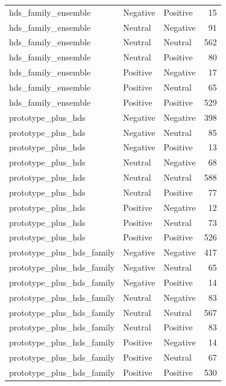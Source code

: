 \begin{tabular}{lllr}
hds\_family\_ensemble & Negative & Positive & 15 \\
hds\_family\_ensemble & Neutral & Negative & 91 \\
hds\_family\_ensemble & Neutral & Neutral & 562 \\
hds\_family\_ensemble & Neutral & Positive & 80 \\
hds\_family\_ensemble & Positive & Negative & 17 \\
hds\_family\_ensemble & Positive & Neutral & 65 \\
hds\_family\_ensemble & Positive & Positive & 529 \\
prototype\_plus\_hds & Negative & Negative & 398 \\
prototype\_plus\_hds & Negative & Neutral & 85 \\
prototype\_plus\_hds & Negative & Positive & 13 \\
prototype\_plus\_hds & Neutral & Negative & 68 \\
prototype\_plus\_hds & Neutral & Neutral & 588 \\
prototype\_plus\_hds & Neutral & Positive & 77 \\
prototype\_plus\_hds & Positive & Negative & 12 \\
prototype\_plus\_hds & Positive & Neutral & 73 \\
prototype\_plus\_hds & Positive & Positive & 526 \\
prototype\_plus\_hds\_family & Negative & Negative & 417 \\
prototype\_plus\_hds\_family & Negative & Neutral & 65 \\
prototype\_plus\_hds\_family & Negative & Positive & 14 \\
prototype\_plus\_hds\_family & Neutral & Negative & 83 \\
prototype\_plus\_hds\_family & Neutral & Neutral & 567 \\
prototype\_plus\_hds\_family & Neutral & Positive & 83 \\
prototype\_plus\_hds\_family & Positive & Negative & 14 \\
prototype\_plus\_hds\_family & Positive & Neutral & 67 \\
prototype\_plus\_hds\_family & Positive & Positive & 530 \\
\bottomrule
\end{tabular}

